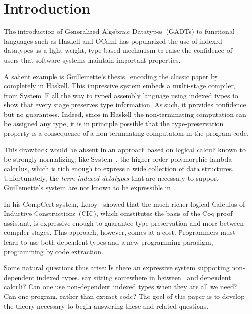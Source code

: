 \section{Introduction}
\label{sec:intro}


The introduction of Generalized Algebraic Datatypes~(GADTs) to
functional languages such as Haskell and OCaml has popularized
the use of indexed datatypes as a light-weight, type-based mechanism
to raise the confidence of users that software systems maintain important
properties.  

A salient example is Guillemette's thesis~\cite{guillemetteThesis}
encoding the classic paper by~\citet{tal-toplas} completely
in Haskell. This impressive system embeds a multi-stage compiler, from
System~F all the way to typed assembly language using indexed types to
show that every stage preserves type information.
%
As such, it provides confidence but no guarantees.  Indeed, since in
Haskell the non-terminating computation can be assigned any type, it is in
principle possible that the type-preservation property is a consequence of
a non-terminating computation in the program code.

This drawback would be absent in an approach based on logical calculi
known to be strongly normalizing; like System~\Fw, the higher-order
polymorphic lambda calculus, which is rich enough to express a wide
collection of data structures.  Unfortunately, the \emph{term-indexed
datatypes} that are necessary to support Guillemette's system are not
known to be expressible in \Fw.

In his CompCert system, Leroy~\cite{Leroy-Compcert-CACM} showed that the
much richer logical Calculus of Inductive Constructions~(CIC), which
constitutes the basis of the Coq proof assistant, is expressive enough to
guarantee type preservation and more between compiler stages.  This
approach, however, comes at a cost.  Programmers must learn to use both
dependent types and a new programming paradigm, programming by code
extraction.

Some natural questions thus arise: Is there an expressive system
supporting non-dependent indexed types, say sitting somewhere in between
\Fw\ and dependent calculi?  
Can one use non-dependent indexed types when they are all we
need?
Can one program, rather than extract code? 
The goal of this paper is to develop the theory necessary to begin
answering these and related questions.  

